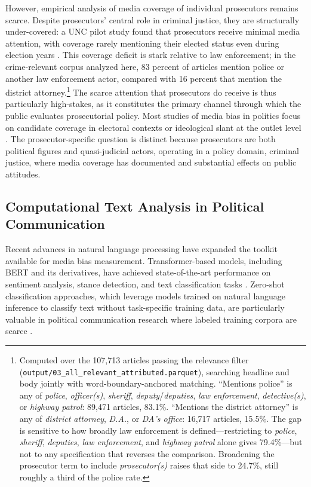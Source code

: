 \documentclass[12pt, letterpaper]{article}
\begin{document}
However, empirical analysis of media coverage of individual prosecutors remains scarce. Despite prosecutors' central role in criminal justice, they are structurally under-covered: a UNC pilot study found that prosecutors receive minimal media attention, with coverage rarely mentioning their elected status even during election years \citep{hessick2023}. This coverage deficit is stark relative to law enforcement; in the crime-relevant corpus analyzed here, 83 percent of articles mention police or another law enforcement actor, compared with 16 percent that mention the district attorney.\footnote{Computed over the 107{,}713 articles passing the relevance filter (\texttt{output/03\_all\_relevant\_attributed.parquet}), searching headline and body jointly with word-boundary-anchored matching. ``Mentions police'' is any of \emph{police}, \emph{officer(s)}, \emph{sheriff}, \emph{deputy}/\emph{deputies}, \emph{law enforcement}, \emph{detective(s)}, or \emph{highway patrol}: 89{,}471 articles, 83.1\%. ``Mentions the district attorney'' is any of \emph{district attorney}, \emph{D.A.}, or \emph{DA's office}: 16{,}717 articles, 15.5\%. The gap is sensitive to how broadly law enforcement is defined---restricting to \emph{police}, \emph{sheriff}, \emph{deputies}, \emph{law enforcement}, and \emph{highway patrol} alone gives 79.4\%---but not to any specification that reverses the comparison. Broadening the prosecutor term to include \emph{prosecutor(s)} raises that side to 24.7\%, still roughly a third of the police rate.} The scarce attention that prosecutors do receive is thus particularly high-stakes, as it constitutes the primary channel through which the public evaluates prosecutorial policy. Most studies of media bias in politics focus on candidate coverage in electoral contexts \citep{dalessio2000,puglisi2011} or ideological slant at the outlet level \citep{groseclose2005,gentzkow2010}. The prosecutor-specific question is distinct because prosecutors are both political figures and quasi-judicial actors, operating in a policy domain, criminal justice, where media coverage has documented and substantial effects on public attitudes.

\subsection{Computational Text Analysis in Political Communication}

Recent advances in natural language processing have expanded the toolkit available for media bias measurement. Transformer-based models, including BERT \citep{devlin2019} and its derivatives, have achieved state-of-the-art performance on sentiment analysis, stance detection, and text classification tasks \citep{liu2019}. Zero-shot classification approaches, which leverage models trained on natural language inference to classify text without task-specific training data, are particularly valuable in political communication research where labeled training corpora are scarce \citep{yin2019}.
\end{document}
